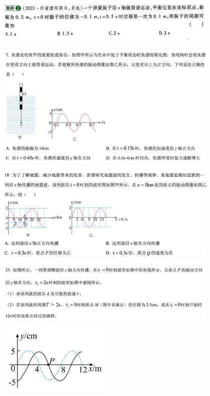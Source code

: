 \documentclass{article}
\begin{document}
\includegraphics[width = 0.8\textwidth]{./pictures/17.png}

\vspace{5em}

\includegraphics[width = 0.8\textwidth]{./pictures/18.png}

\vspace{5em}

\includegraphics[width = 0.8\textwidth]{./pictures/19.png}

\vspace{5em}

\includegraphics[width = 0.8\textwidth]{./pictures/20-1.png}

\includegraphics[width = 0.4\textwidth]{./pictures/20-2.png}
\end{document}
